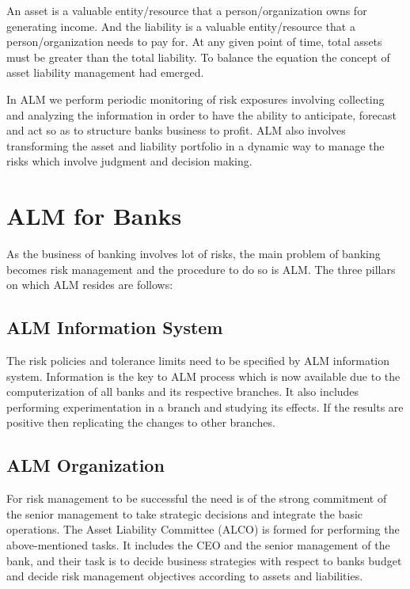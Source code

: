 	An asset is a valuable entity/resource that a person/organization owns for generating income.  And the liability is a valuable entity/resource that a person/organization needs to pay for. At any given point of time, total assets must be greater than the total liability. To balance the equation the concept of asset liability management had emerged. 

	In ALM we perform periodic monitoring of risk exposures involving collecting and analyzing the information in order to have the ability to anticipate, forecast and act so as to structure banks business to profit. ALM also involves transforming the asset and liability portfolio in a dynamic way to manage the risks which involve judgment and decision making.



	
\section{ALM for Banks}

	As the business of banking involves lot of risks, the main problem of banking becomes risk management and the procedure to do so is ALM. The three pillars on which ALM resides are follows:

	\subsection{ALM Information System}
		The risk policies and tolerance limits need to be specified by ALM information system. Information is the key to ALM process which is now available due to the computerization of all banks and its respective branches. It also includes performing experimentation in a branch and studying its effects. If the results are positive then replicating the changes to other branches.

	\subsection{ALM Organization}
		For risk management to be successful the need is of the strong commitment of the senior management to take strategic decisions and integrate the basic operations. The Asset Liability Committee (ALCO) is formed for performing the above-mentioned tasks. It includes the CEO and the senior management of the bank, and their task is to decide business strategies with respect to banks budget and decide risk management objectives according to assets and liabilities. 

